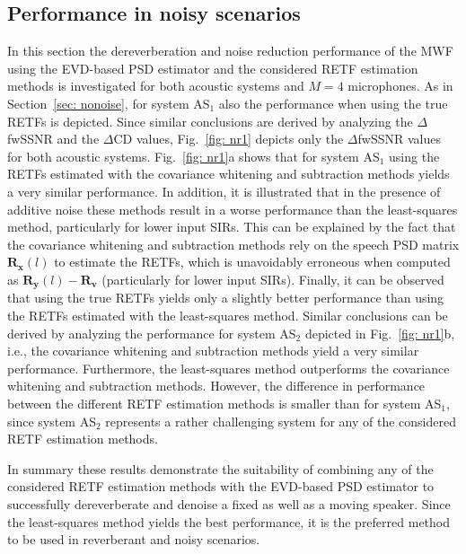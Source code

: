 \documentclass{article}
\begin{document}
\subsection{Performance in noisy scenarios}
\label{sec: noise}
In this section the dereverberation and noise reduction performance of the MWF using the EVD-based PSD estimator and the considered RETF estimation methods is investigated for both acoustic systems and $M = 4$ microphones.
As in Section~\ref{sec: nonoise}, for system AS$_1$ also the performance when using the true RETFs is depicted.
Since similar conclusions are derived by analyzing the $\Delta$fwSSNR and the $\Delta$CD values, Fig.~\ref{fig: nr1} depicts only the $\Delta$fwSSNR values for both acoustic systems.
Fig.~\ref{fig: nr1}a shows that for system AS$_1$ using the RETFs estimated with the covariance whitening and subtraction methods yields a very similar performance.
In addition, it is illustrated that in the presence of additive noise these methods result in a worse performance than the least-squares method, particularly for lower input SIRs.
This can be explained by the fact that the covariance whitening and subtraction methods rely on the speech PSD matrix $\mathbf{R}_{\mathbf{x}}(l)$ to estimate the RETFs, which is unavoidably erroneous when computed as $\mathbf{R}_{\mathbf{y}}(l) - \mathbf{R}_{\mathbf{v}}$ (particularly for lower input SIRs).
Finally, it can be observed that using the true RETFs yields only a slightly better performance than using the RETFs estimated with the least-squares method.
Similar conclusions can be derived by analyzing the performance for system AS$_2$ depicted in Fig.~\ref{fig: nr1}b, i.e., the covariance whitening and subtraction methods yield a very similar performance.
Furthermore, the least-squares method outperforms the covariance whitening and subtraction methods.
However, the difference in performance between the different RETF estimation methods is smaller than for system AS$_1$, since system AS$_2$ represents a rather challenging system for any of the considered RETF estimation methods.

In summary these results demonstrate the suitability of combining any of the considered RETF estimation methods with the EVD-based PSD estimator to successfully dereverberate and denoise a fixed as well as a moving speaker.
Since the least-squares method yields the best performance, it is the preferred method to be used in reverberant and noisy scenarios.

\vspace{-0.3cm}
\end{document}
